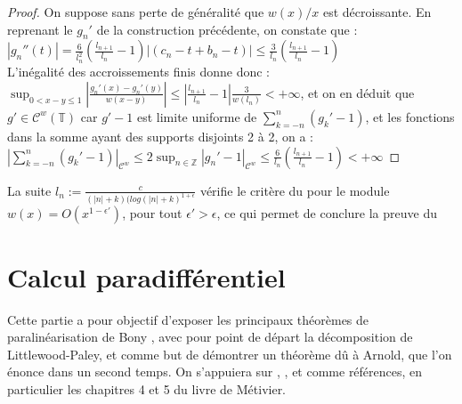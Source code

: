 \documentclass[11pt,a4paper]{article}
\begin{document}
\begin{proof}
 On suppose sans perte de généralité que $w(x)/x$ est décroissante. En reprenant le $g_n'$ de la construction précédente, on constate que :  \\

$\displaystyle |g_n''(t)| = \frac{6}{l_n^2}(\frac{l_{n+1}}{l_n}-1)|(c_n-t + b_n -t)| \leq  \frac{3}{l_n}(\frac{l_{n+1}}{l_n}-1) $ \\

L'inégalité des accroissements finis donne donc : \\

$\displaystyle \sup_{0<x-y\leq 1} \left | \frac{g_n'(x) - g_n'(y)}{w(x-y)}\right | \leq \left | \frac{l_{n+1}}{l_n}-1\right | \frac{3}{w(l_n)} < +\infty$, et on en déduit que $g' \in \mathcal{C}^w(\mathbb{T})$ car $g'-1$ est limite uniforme de $\displaystyle  \sum_{k = -n}^n (g_k'-1)$, et les fonctions dans la somme ayant des supports disjoints 2 à 2, on a :\\

$\displaystyle  \left | \sum_{k = -n}^n (g_k'-1) \right |_{\mathcal{C}^w} \leq 2\sup_{n \in \mathbb{Z}} |g_n' -1|_{\mathcal{C}^w} \leq \frac{6}{l_n}(\frac{l_{n+1}}{l_n}-1) < + \infty $ 
\end{proof}

La suite $ \displaystyle l_n := \frac{c}{(|n|+k)(log(|n| + k)^{1+\epsilon}}$ vérifie le critère du  pour le module $w(x)=O(x^{1-\epsilon'})$, pour tout $\epsilon' > \epsilon$, ce qui permet de conclure la preuve du 

\section{Calcul paradifférentiel}
Cette partie a pour objectif d'exposer les principaux théorèmes de paralinéarisation de Bony \cite{bony}, avec pour point de départ la décomposition de Littlewood-Paley, et comme but de démontrer un théorème dû à Arnold, que l'on énonce dans un second temps. On s'appuiera sur \cite{metivier}, \cite{dgv}, et \cite{alinhac_gerard} comme références, en particulier les chapitres 4 et 5 du livre de Métivier.
\end{document}
